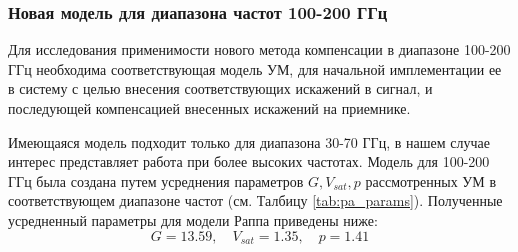 \subsubsection{Новая модель для диапазона частот 100-200 ГГц}
Для исследования применимости нового метода компенсации в диапазоне 100-200
ГГц необходима соответствующая модель УМ, для начальной имплементации ее в
систему с целью внесения соответствующих искажений в сигнал, и последующей
компенсацией внесенных искажений на приемнике. 

Имеющаяся модель \cite{nokia163314} подходит только для диапазона  30-70
ГГц, в нашем случае интерес представляет работа при более высоких частотах.
Модель для 100-200 ГГц была создана путем усреднения параметров $G,
V_{sat}, p$ рассмотренных УМ в соответствующем диапазоне частот (см. Талбицу
\ref{tab:pa_params}). Полученные усредненный параметры для модели Раппа
приведены ниже:
\begin{equation}
    G = 13.59, \quad V_{sat} = 1.35, \quad p = 1.41
\end{equation}



